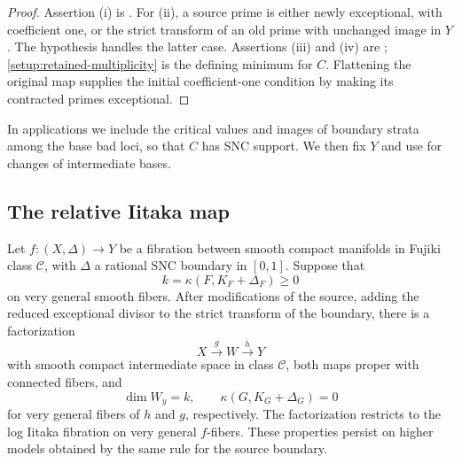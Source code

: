 \begin{proof}
Assertion (i) is . For (ii), a source prime
is either newly exceptional, with coefficient one, or the strict
transform of an old prime with unchanged image in $Y$. The hypothesis
handles the latter case. Assertions (iii) and (iv) are
;
\eqref{setup:retained-multiplicity} is the defining minimum for $C$.
Flattening the original map supplies the initial coefficient-one
condition by making its contracted primes exceptional.
\end{proof}

In applications we include the critical values and images of boundary
strata among the base bad loci, so that $C$ has SNC support. We then
fix $Y$ and use  for changes of intermediate
bases.

\subsection{The relative Iitaka map}

\begin{lemma}
\label{application:relative-iitaka}
Let \(f:(X,\Delta)\to Y\) be a fibration between smooth compact
manifolds in Fujiki class \(\mathcal C\), with \(\Delta\) a rational
SNC boundary in \([0,1]\). Suppose that
\[
 k=\kappa(F,K_F+\Delta_F)\geq 0
\]
on very general smooth fibers.  After modifications of the source, adding
the reduced exceptional divisor to the strict transform of the boundary,
there is a factorization
\[
 X\xrightarrow{g}W\xrightarrow{h}Y
\]
with smooth compact intermediate space in class \(\mathcal C\), both
maps proper with connected fibers, and
\[
 \dim W_y=k,\qquad
 \kappa(G,K_G+\Delta_G)=0
\]
for very general fibers of \(h\) and \(g\), respectively.  The factorization
restricts to the log Iitaka fibration on very general \(f\)-fibers.
These properties persist on higher models obtained by the same rule for
the source boundary.
\end{lemma}

